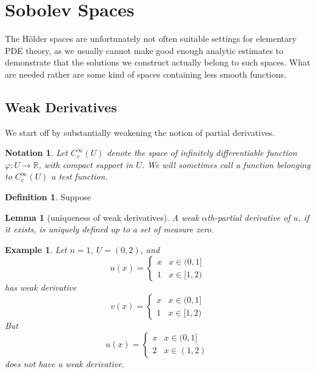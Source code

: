 \documentclass{article}
\newtheorem{notation}{Notation}
\newtheorem{lemma}{Lemma}[section]
\newtheorem{example}{Example}[section]
\theoremstyle{definition}
\newtheorem{definition}{Definition}[section]
\begin{document}
\section{Sobolev Spaces}
The H\"older spaces are unfortunately not often suitable settings for elementary PDE theory,
as we usually cannot make good enough analytic estimates to demonstrate that the solutions we construct actually belong to such spaces.
What are needed rather are some kind of spaces containing less smooth functions.

\subsection{Weak Derivatives}
We start off by substantially weakening the notion of partial derivatives.
\begin{notation}
Let $C_c^\infty(U)$ denote the space of infinitely differentiable function $\varphi:U\to\mathbb{R}$, with compact support in $U$.
We will sometimes call a function belonging to $C_c^\infty(U)$ a test function.
\end{notation}

\begin{definition}
    Suppose 
\end{definition}

\begin{lemma}[uniqueness of weak derivatives]
    A weak $\alpha$th-partial derivative of $u$, if it exists, is uniquely defined up to a set of measure zero.
\end{lemma}

\begin{example}
    Let $n=1$, $U=(0,2)$, and 
    \[ u(x)=\left\{\begin{matrix}
        x  & x\in(0,1]\\
        1  & x\in[1,2)
        \end{matrix}\right.\] 
    has weak derivative 
        \[
            v(x)=\left\{\begin{matrix}
            x  & x\in(0,1]\\
            1  & x\in[1,2)
            \end{matrix}\right.\] 
    But \[ u(x)=\left\{\begin{matrix}
        x  & x\in(0,1]\\
        2  & x\in(1,2)
        \end{matrix}\right.\] 
    does not have a weak derivative.
        
\end{example}
\end{document}
